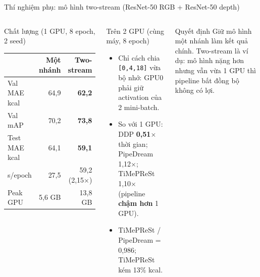 \documentclass[10pt,aspectratio=169]{beamer}
\newcommand{\highlight}[1]{\textcolor{accent}{\bfseries #1}}
\begin{document}
\begin{frame}{Thí nghiệm phụ: mô hình two-stream (ResNet-50 RGB + ResNet-50 depth)}
\begin{columns}[T]
\begin{uitbox}{\faImages\; Chất lượng (1 GPU, 8 epoch, 2 seed)}
\scriptsize
\setlength{\tabcolsep}{4pt}
\begin{tabular}{@{}lrr@{}}
\toprule
 & \textbf{Một nhánh} & \textbf{Two-stream} \\
\midrule
Val MAE kcal & 64,9 & \textbf{62,2} \\
Val mAP & 70,2 & \textbf{73,8} \\
Test MAE kcal & 64,1 & \textbf{59,1} \\
s/epoch & 27,5 & 59,2 (2,15$\times$) \\
Peak GPU & 5,6 GB & 13,8 GB \\
\bottomrule
\end{tabular}
\end{uitbox}

\begin{accentbox}{\faServer\; Trên 2 GPU (cùng máy, 8 epoch)}
\scriptsize
\begin{itemize}
  \item Chỉ cách chia \texttt{[0,4,18]} vừa bộ nhớ: GPU0 phải giữ activation của 2 mini-batch.
  \item So với 1 GPU: DDP \highlight{0,51$\times$} thời gian; PipeDream 1,12$\times$; TiMePReSt 1,10$\times$ (pipeline \textbf{chậm hơn} 1 GPU).
  \item TiMePReSt / PipeDream = 0,986; TiMePReSt kém 13\% kcal.
\end{itemize}
\end{accentbox}
\vspace{0.1cm}
\begin{greenbox}{\faFlag\; Quyết định}
\scriptsize
Giữ mô hình một nhánh làm kết quả chính. Two-stream là ví dụ: mô hình nặng hơn nhưng vẫn vừa 1 GPU thì pipeline bất đồng bộ không có lợi.
\end{greenbox}
\end{columns}
\end{frame}
\end{document}
